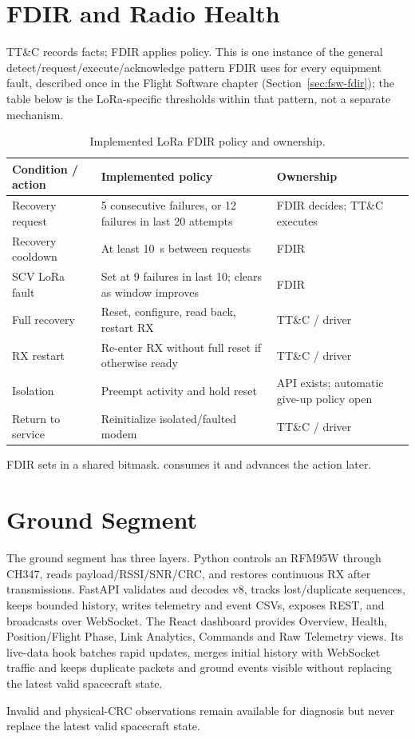 \section{FDIR and Radio Health}
\label{sec:ttc-fdir-radio}

TT\&C records facts; FDIR applies policy. This is one instance of the
general detect/request/execute/acknowledge pattern FDIR uses for every
equipment fault, described once in the Flight Software chapter
(Section~\ref{sec:fsw-fdir}); the table below is the LoRa-specific
thresholds within that pattern, not a separate mechanism.

\begin{table}[H]
\centering
\begin{tabular}{p{4.3cm}p{5.2cm}p{4.7cm}}
\toprule
\textbf{Condition / action} & \textbf{Implemented policy} & \textbf{Ownership} \\
\midrule
Recovery request & 5 consecutive failures, or 12 failures in last 20 attempts & FDIR decides; TT\&C executes \\
Recovery cooldown & At least 10~s between requests & FDIR \\
SCV LoRa fault & Set at 9 failures in last 10; clears as window improves & FDIR \\
Full recovery & Reset, configure, read back, restart RX & TT\&C / driver \\
RX restart & Re-enter RX without full reset if otherwise ready & TT\&C / driver \\
Isolation & Preempt activity and hold reset & API exists; automatic give-up policy open \\
Return to service & Reinitialize isolated/faulted modem & TT\&C / driver \\
\bottomrule
\end{tabular}
\caption{Implemented LoRa FDIR policy and ownership.}
\label{tab:ttc-fdir}
\end{table}

FDIR sets  in a shared bitmask.
 consumes it and advances the action later.

\section{Ground Segment}

The ground segment has three layers. Python controls an RFM95W through CH347,
reads payload/RSSI/SNR/CRC, and restores continuous RX after transmissions.
FastAPI validates and decodes v8, tracks lost/duplicate sequences, keeps bounded
history, writes telemetry and event CSVs, exposes REST, and broadcasts over
WebSocket. The React dashboard provides Overview, Health, Position/Flight
Phase, Link Analytics, Commands and Raw Telemetry views. Its live-data hook
batches rapid updates, merges initial history with WebSocket traffic and keeps
duplicate packets and ground events visible without replacing the latest valid
spacecraft state.

Invalid and physical-CRC observations remain available for diagnosis but never
replace the latest valid spacecraft state. 